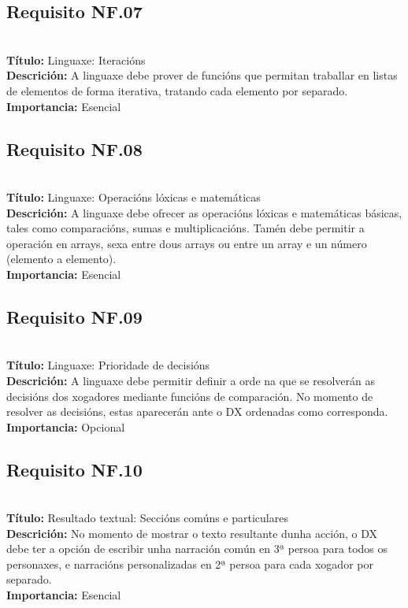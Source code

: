 \subsection{Requisito NF.07}~\\
{\bf Título:} Linguaxe: Iteracións\\
{\bf Descrición:} A linguaxe debe prover de funcións que permitan traballar en listas de elementos de forma iterativa, tratando cada elemento por separado.\\
{\bf Importancia:} Esencial

\subsection{Requisito NF.08}~\\
{\bf Título:} Linguaxe: Operacións lóxicas e matemáticas\\
{\bf Descrición:} A linguaxe debe ofrecer as operacións lóxicas e matemáticas básicas, tales como comparacións, sumas e multiplicacións. Tamén debe permitir a operación en arrays, sexa entre dous arrays ou entre un array e un número (elemento a elemento).\\
{\bf Importancia:} Esencial

\subsection{Requisito NF.09}~\\
{\bf Título:} Linguaxe: Prioridade de decisións\\
{\bf Descrición:} A linguaxe debe permitir definir a orde na que se resolverán as decisións dos xogadores mediante funcións de comparación. No momento de resolver as decisións, estas aparecerán ante o DX ordenadas como corresponda.\\
{\bf Importancia:} Opcional

\subsection{Requisito NF.10}~\\
{\bf Título:} Resultado textual: Seccións comúns e particulares\\
{\bf Descrición:} No momento de mostrar o texto resultante dunha acción, o DX debe ter a opción de escribir unha narración común en 3ª persoa para todos os personaxes, e narracións personalizadas en 2ª persoa para cada xogador por separado.\\
{\bf Importancia:} Esencial

